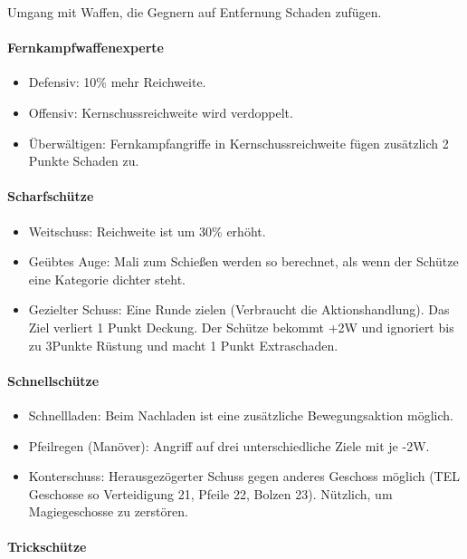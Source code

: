 \documentclass{article}
\begin{document}
Umgang mit Waffen, die Gegnern auf Entfernung Schaden zufügen.

\paragraph{Fernkampfwaffenexperte}

\begin{itemize}
\item Defensiv: 10\% mehr Reichweite.
\item Offensiv: Kernschussreichweite wird verdoppelt.
\item Überwältigen: Fernkampfangriffe in Kernschussreichweite fügen zusätzlich 2 Punkte Schaden zu.
\end{itemize}

\paragraph{Scharfschütze}

\begin{itemize}
\item Weitschuss: Reichweite ist um 30\% erhöht.
\item Geübtes Auge: Mali zum Schießen werden so berechnet, als wenn der Schütze eine Kategorie dichter steht.
\item Gezielter Schuss: Eine Runde zielen (Verbraucht die Aktionshandlung). Das Ziel verliert 1 Punkt Deckung. Der Schütze bekommt +2W und ignoriert bis zu 3Punkte Rüstung und macht 1 Punkt Extraschaden.
\end{itemize}

\paragraph{Schnellschütze}

\begin{itemize}
\item Schnellladen: Beim Nachladen ist eine zusätzliche Bewegungsaktion möglich.
\item Pfeilregen (Manöver): Angriff auf drei unterschiedliche Ziele mit je -2W.
\item Konterschuss: Herausgezögerter Schuss gegen anderes Geschoss möglich (TEL Geschosse so Verteidigung 21, Pfeile 22, Bolzen 23). Nützlich, um Magiegeschosse zu zerstören.
\end{itemize}

\paragraph{Trickschütze}
\end{document}
